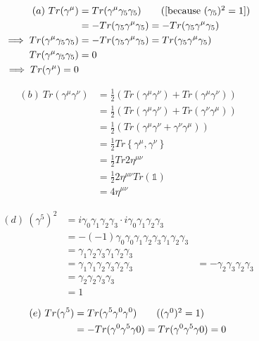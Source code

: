 \documentclass[12pt, letterpaper]{article}
\newcommand*{\1}{\hspace{1pt}}
\begin{document}
\begin{align*}
	(a) \ Tr(\gamma ^{\mu}) &= Tr(\gamma ^{\mu} \gamma _{5} \gamma _{5}) \tag{[because $(\gamma _{5})^{2} = 1]$} \\
	&= - Tr(\gamma _{5} \gamma ^{\mu} \gamma _{5}) = - Tr(\gamma _{5} \gamma ^{\mu} \gamma _{5}) \\ 
	\implies  Tr(\gamma ^{\mu} \gamma _{5} \gamma _{5}) &= - Tr(\gamma _{5} \gamma ^{\mu} \gamma _{5}) = Tr(\gamma _{5} \gamma ^{\mu} \gamma _{5}) \\ 
	 Tr(\gamma ^{\mu} \gamma _{5} \gamma _{5}) &= 0 \\
	 \implies Tr(\gamma ^{\mu}) = 0
\end{align*}

\begin{align*}
    (b) \ Tr(\gamma ^{\mu} \gamma ^{\nu}) &= \frac{1}{2}\left(Tr(\gamma ^{\mu} \gamma ^{\nu}) + Tr(\gamma ^{\mu} \gamma ^{\nu}) \right) \\ 
    &= \frac{1}{2}\left(Tr(\gamma ^{\mu} \gamma ^{\nu}) + Tr(\gamma ^{\nu} \gamma ^{\mu}) \right) \\
    &= \frac{1}{2}\left(Tr(\gamma ^{\mu} \gamma ^{\nu} + \gamma ^{\nu} \gamma ^{\mu}) \right) \\
    &= \frac{1}{2} Tr \left\{ \gamma ^{\mu}, \gamma ^{\nu}\right\} \\ 
    &= \frac{1}{2} Tr 2 \eta ^{\mu \nu} \\ 
    &= \frac{1}{2} 2 \eta ^{\mu \nu} Tr(\mathbb{1}) \\
    &= 4 \eta ^{\mu \nu}
\end{align*}

\begin{align*}
    (d) \ (\gamma ^{5}) ^{2} &= i \gamma _{0} \gamma _{1} \gamma _{2} \gamma _{3} \cdot i \gamma _{0} \gamma _{1} \gamma _{2} \gamma _{3} \\
    &= - (-1) \gamma _{0} \gamma _{0} \gamma _{1} \gamma _{2} \gamma _{3} \gamma _{1} \gamma _{2} \gamma _{3} \\ 
    &= \gamma _{1} \gamma _{2} \gamma _{3}\gamma _{1} \gamma _{2} \gamma _{3} \\ 
    &= \gamma _{1} \gamma _{1} \gamma _{2} \gamma _{3} \gamma _{2} \gamma _{3} 
    &= - \gamma _{2} \gamma _{3}\gamma _{2} \gamma _{3} \\ 
    &= \gamma _{2} \gamma _{2} \gamma _{3}\gamma _{3} \\ 
    &= 1
\end{align*}

\begin{align*}
    (e) \ Tr (\gamma ^{5}) &= Tr (\gamma ^{5} \gamma ^{0} \gamma ^{0}) \tag{$(\gamma ^{0})^{2} = 1$} \\
    &= - Tr(\gamma ^{0} \gamma ^{5} \gamma {0}) = Tr(\gamma ^{0} \gamma ^{5} \gamma {0}) = 0
\end{align*}
\end{document}

